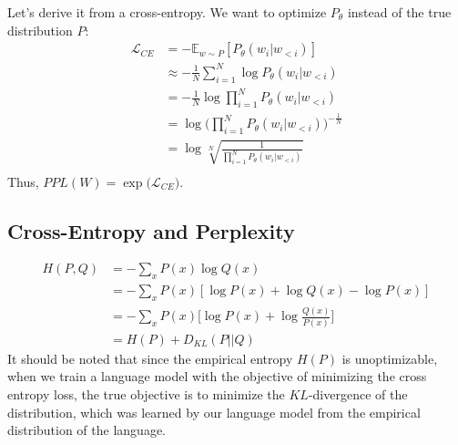 Let's derive it from a cross-entropy. We want to optimize $P_\theta$ instead of the true distribution $P$:
\begin{align}
	\mathcal{L}_{CE} &= -\mathbb{E}_{w\sim P} [P_\theta(w_{i}|w_{<i})]\\
	&\approx -\frac{1}{N} \sum_{i=1}^{N} \log P_\theta(w_{i}|w_{<i})\\
	&= -\frac{1}{N} \log \prod_{i=1}^{N} P_\theta(w_{i}|w_{<i})\\
	&=  \log \Bigg(\prod_{i=1}^{N} P_\theta(w_{i}|w_{<i}) \Bigg)^{-\frac{1}{N}}\\
	&=  \log \sqrt[N]{\frac{1}{\prod_{i=1}^{N} P_\theta(w_{i}|w_{<i})}}\\
	\label{eq:ppl_entropy}
\end{align}
Thus, $PPL(W) = \exp\Big(\mathcal{L}_{CE}\Big).$

\subsection{Cross-Entropy and Perplexity}
\begin{align*}
	H(P,Q) &= -\sum_{x}P(x)\log Q(x) \\
	&= -\sum_{x}P(x) [\log P(x) + \log Q(x) - \log P(x)] \\
	&= -\sum_{x}P(x)\Bigg[\log P(x) + \log\frac{Q(x)}{P(x)}\Bigg] \\
	&= H(P) + D_{KL}(P||Q)
\end{align*}
It should be noted that since the empirical entropy $H(P)$ is unoptimizable, when we train a language model with the objective of minimizing the cross entropy loss, the true objective is to minimize the $KL$-divergence of the distribution, which was learned by our language model from the empirical distribution of the language.
